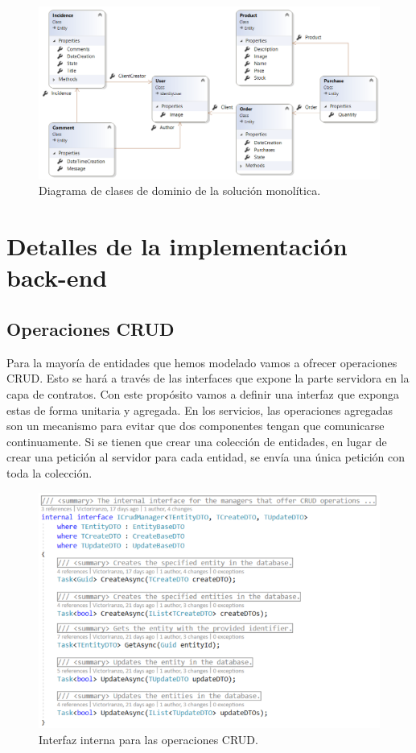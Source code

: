 \documentclass[11pt,spanish,listoffigures]{tfgetsinf}
\begin{document}
\begin{figure}[h]
\centering
\includegraphics[scale=0.65]{ClassDiagram}
\caption{Diagrama de clases de dominio de la solución monolítica.}
\end{figure}

\newpage

\section{Detalles de la implementación back-end}

\subsection{Operaciones CRUD} \label{subsect:CRUD}

Para la mayoría de entidades que hemos modelado vamos a ofrecer operaciones CRUD. Esto se hará a través de las interfaces que expone la parte servidora en la capa de contratos. Con este propósito vamos a definir una interfaz que exponga estas de forma unitaria y agregada. En los servicios, las operaciones agregadas son un mecanismo para evitar que dos componentes tengan que comunicarse continuamente. Si se tienen que crear una colección de entidades, en lugar de crear una petición al servidor para cada entidad, se envía una única petición con toda la colección. \cite{Newman2015a} 

\begin{figure}[h]
\centering
\includegraphics[scale=0.8]{ICrudManager}
\caption{Interfaz interna para las operaciones CRUD.}
\end{figure}
\end{document}
